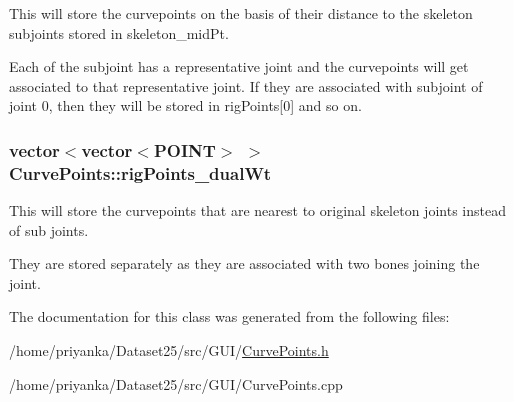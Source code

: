 \-This will store the curvepoints on the basis of their distance to the skeleton subjoints stored in skeleton\-\_\-mid\-Pt. 

\-Each of the subjoint has a representative joint and the curvepoints will get associated to that representative joint. \-If they are associated with subjoint of joint 0, then they will be stored in rig\-Points\mbox{[}0\mbox{]} and so on. \hypertarget{classCurvePoints_ac689fabd6c2d26c074fba5078946d8f6}{
\subsubsection[{rig\-Points\-\_\-dual\-Wt}]{\setlength{\rightskip}{0pt plus 5cm}vector$<$vector$<${\bf \-P\-O\-I\-N\-T}$>$ $>$ {\bf \-Curve\-Points\-::rig\-Points\-\_\-dual\-Wt}}}\label{classCurvePoints_ac689fabd6c2d26c074fba5078946d8f6}


\-This will store the curvepoints that are nearest to original skeleton joints instead of sub joints. 

\-They are stored separately as they are associated with two bones joining the joint. 

\-The documentation for this class was generated from the following files\-:\begin{DoxyCompactItemize}
\item 
/home/priyanka/\-Dataset25/src/\-G\-U\-I/\hyperlink{CurvePoints_8h}{\-Curve\-Points.\-h}\item 
/home/priyanka/\-Dataset25/src/\-G\-U\-I/\-Curve\-Points.\-cpp\end{DoxyCompactItemize}
